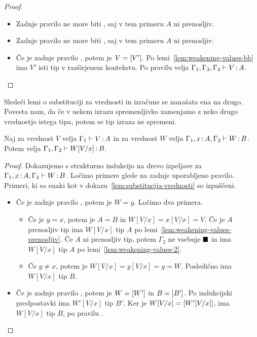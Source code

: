 \begin{proof}
\begin{itemize}
		\item Zadnje pravilo ne more biti , saj v tem primeru $A$ ni prenosljiv.
		
		\item Zadnje pravilo ne more biti , saj v tem primeru $A$ ni prenosljiv.
		
		\item Če je zadnje pravilo , potem je $V = [V']$.
		Po lemi~\ref{lem:weakening-values-bb} ima $V'$ isti tip v razširjenem kontekstu.
		Po pravilu  velja $\Gamma_1, \Gamma_3, \Gamma_2 \vdash V \mathinner{:} A$.
		
	\end{itemize}
\end{proof}

Sledeči lemi o substituciji za vrednosti in izračune se nanašata ena na drugo. Povesta nam, da če v nekem izrazu spremenljivko zamenjamo z neko drugo vrednostjo istega tipa, potem se tip izraza ne spremeni.

\begin{lema}\label{lem:substitucija-vrednosti-2}
	Naj za vrednost $V$ velja $\Gamma_1 \vdash V \mathinner{:} A$ in za vrednost $W$ velja $\Gamma_1, x \mathinner{:} A, \Gamma_2 \vdash W \mathinner{:} B$. Potem velja $\Gamma_1, \Gamma_2 \vdash W[V/x] \mathinner{:} B$.
\end{lema}

\begin{proof}
	Dokazujemo s strukturno indukcijo na drevo izpeljave za $\Gamma_1, x \mathinner{:} A, \Gamma_2 \vdash W \mathinner{:} B$.
	Ločimo primere glede na zadnje uporabljeno pravilo.
	Primeri, ki so enaki kot v dokazu~\ref{lem:substitucija-vrednosti} so izpuščeni.
	
	\begin{itemize}
		\item Če je zadnje pravilo , potem je $W = y$.
		Ločimo dva primera.
		\begin{itemize}
			\item Če je $y = x$, potem je $A = B$ in $W[V/x] = x[V/x] = V$. Če je $A$ prenosljiv tip ima $W[V/x]$ tip $A$ po lemi~\ref{lem:weakening-values-prenosljiv}. Če $A$ ni prenosljiv tip, potem $\Gamma_2$ ne vsebuje $\blacksquare$ in ima $W[V/x]$ tip $A$ po lemi~\ref{lem:weakening-values-2}.
			
			\item Če $y \neq x$, potem je $W[V/x] = y[V/x] = y = W$. Posledično ima $W[V/x]$ tip $B$.
		\end{itemize}
		
		\item Če je zadnje pravilo , potem je $W=[W']$ in $B=[B']$. Po indukcijski predpostavki ima $W'[V/x]$ tip $B'$. Ker je $W[V/x] = [W'[V/x]]$, ima $W[V/x]$ tip $B$, po pravilu .
		
	\end{itemize}
\end{proof}

